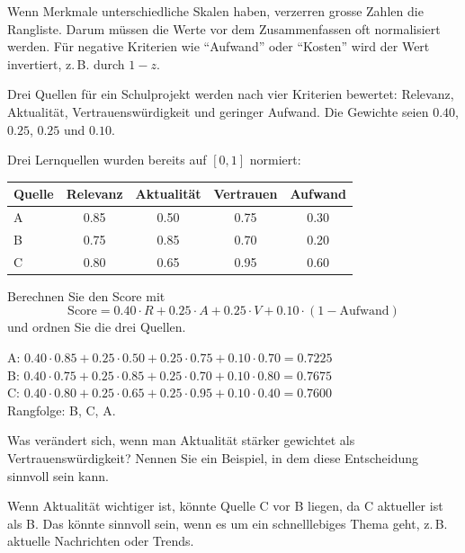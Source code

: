 \begin{mycaution}
    Wenn Merkmale unterschiedliche Skalen haben, verzerren grosse Zahlen die Rangliste.
    Darum müssen die Werte vor dem Zusammenfassen oft normalisiert werden.
    Für negative Kriterien wie \enquote{Aufwand} oder \enquote{Kosten} wird der Wert invertiert,
    z.\,B. durch $1-z$.
\end{mycaution}

\begin{myexample}
    Drei Quellen für ein Schulprojekt werden nach vier Kriterien bewertet:
    Relevanz, Aktualität, Vertrauenswürdigkeit und geringer Aufwand.
    Die Gewichte seien $0.40$, $0.25$, $0.25$ und $0.10$.
\end{myexample}

\begin{myexercise}
    Drei Lernquellen wurden bereits auf $[0,1]$ normiert:

    \begin{center}
        \begin{tabular}{lcccc}
            \toprule
            Quelle & Relevanz & Aktualität & Vertrauen & Aufwand \\
            \midrule
            A      & 0.85     & 0.50       & 0.75      & 0.30    \\
            B      & 0.75     & 0.85       & 0.70      & 0.20    \\
            C      & 0.80     & 0.65       & 0.95      & 0.60    \\
            \bottomrule
        \end{tabular}
    \end{center}

    Berechnen Sie den Score mit
    \[
        \text{Score} = 0.40\cdot R + 0.25\cdot A + 0.25\cdot V + 0.10\cdot(1-\text{Aufwand})
    \]
    und ordnen Sie die drei Quellen.
    \begin{myanswer}
        A: $0.40\cdot0.85 + 0.25\cdot0.50 + 0.25\cdot0.75 + 0.10\cdot0.70 = 0.7225$ \\
        B: $0.40\cdot0.75 + 0.25\cdot0.85 + 0.25\cdot0.70 + 0.10\cdot0.80 = 0.7675$ \\
        C: $0.40\cdot0.80 + 0.25\cdot0.65 + 0.25\cdot0.95 + 0.10\cdot0.40 = 0.7600$ \\
        Rangfolge: B, C, A.
    \end{myanswer}
\end{myexercise}

\begin{myexercise}
    Was verändert sich, wenn man Aktualität stärker gewichtet als Vertrauenswürdigkeit?
    Nennen Sie ein Beispiel, in dem diese Entscheidung sinnvoll sein kann.
    \begin{myanswer}
        Wenn Aktualität wichtiger ist, könnte Quelle C vor B liegen, da C aktueller ist als B. Das könnte sinnvoll sein, wenn es um ein schnelllebiges Thema geht, z.\,B. aktuelle Nachrichten oder Trends.
    \end{myanswer}
\end{myexercise}
